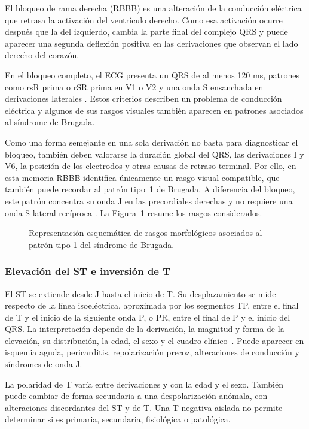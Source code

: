 El bloqueo de rama derecha (RBBB) es una alteración de la conducción eléctrica que retrasa la activación del ventrículo derecho. Como esa activación ocurre después que la del izquierdo, cambia la parte final del complejo QRS y puede aparecer una segunda deflexión positiva en las derivaciones que observan el lado derecho del corazón.

En el bloqueo completo, el ECG presenta un QRS de al menos 120 ms, patrones como rsR prima o rSR prima en V1 o V2 y una onda S ensanchada en derivaciones laterales \cite{surawicz2009}. Estos criterios describen un problema de conducción eléctrica y algunos de sus rasgos visuales también aparecen en patrones asociados al síndrome de Brugada.

Como una forma semejante en una sola derivación no basta para diagnosticar el bloqueo, también deben valorarse la duración global del QRS, las derivaciones I y V6, la posición de los electrodos y otras causas de retraso terminal. Por ello, en esta memoria RBBB identifica únicamente un rasgo visual compatible, que también puede recordar al patrón tipo~1 de Brugada. A diferencia del bloqueo, este patrón concentra su onda J en las precordiales derechas y no requiere una onda S lateral recíproca \cite{surawicz2009}. La Figura~\ref{fig:brugada_pattern} resume los rasgos considerados.

\begin{figure}[H]
  \centering
  \caption{Representación esquemática de rasgos morfológicos asociados al patrón tipo 1 del síndrome de Brugada.}
  \label{fig:brugada_pattern}
\end{figure}

\subsubsection{Elevación del ST e inversión de T}

El ST se extiende desde J hasta el inicio de T. Su desplazamiento se mide respecto de la línea isoeléctrica, aproximada por los segmentos TP, entre el final de T y el inicio de la siguiente onda P, o PR, entre el final de P y el inicio del QRS. La interpretación depende de la derivación, la magnitud y forma de la elevación, su distribución, la edad, el sexo y el cuadro clínico~\cite{rautaharju2009st}. Puede aparecer en isquemia aguda, pericarditis, repolarización precoz, alteraciones de conducción y síndromes de onda J.

La polaridad de T varía entre derivaciones y con la edad y el sexo. También puede cambiar de forma secundaria a una despolarización anómala, con alteraciones discordantes del ST y de T. Una T negativa aislada no permite determinar si es primaria, secundaria, fisiológica o patológica.

